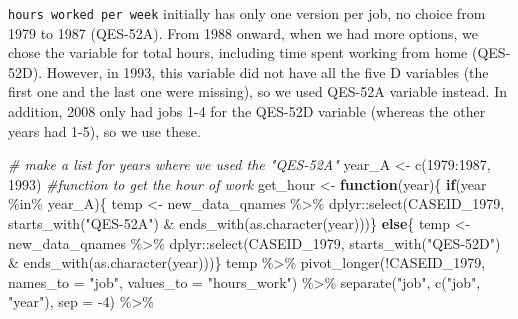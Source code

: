\documentclass[12pt]{article}
\newenvironment{Shaded}{\begin{snugshade}}{\end{snugshade}}
\newcommand{\AttributeTok}[1]{\textcolor[rgb]{0.77,0.63,0.00}{#1}}
\newcommand{\CommentTok}[1]{\textcolor[rgb]{0.56,0.35,0.01}{\textit{#1}}}
\newcommand{\ControlFlowTok}[1]{\textcolor[rgb]{0.13,0.29,0.53}{\textbf{#1}}}
\newcommand{\DecValTok}[1]{\textcolor[rgb]{0.00,0.00,0.81}{#1}}
\newcommand{\FunctionTok}[1]{\textcolor[rgb]{0.00,0.00,0.00}{#1}}
\newcommand{\NormalTok}[1]{#1}
\newcommand{\OtherTok}[1]{\textcolor[rgb]{0.56,0.35,0.01}{#1}}
\newcommand{\SpecialCharTok}[1]{\textcolor[rgb]{0.00,0.00,0.00}{#1}}
\newcommand{\StringTok}[1]{\textcolor[rgb]{0.31,0.60,0.02}{#1}}
\begin{document}
\texttt{hours\ worked\ per\ week} initially has only one version per job, no choice from 1979 to 1987 (QES-52A). From 1988 onward, when we had more options, we chose the variable for total hours, including time spent working from home (QES-52D). However, in 1993, this variable did not have all the five D variables (the first one and the last one were missing), so we used QES-52A variable instead. In addition, 2008 only had jobs 1-4 for the QES-52D variable (whereas the other years had 1-5), so we use these.

\begin{Shaded}
\begin{Highlighting}[]
\CommentTok{\# make a list for years where we used the "QES{-}52A"}
\NormalTok{year\_A }\OtherTok{\textless{}{-}} \FunctionTok{c}\NormalTok{(}\DecValTok{1979}\SpecialCharTok{:}\DecValTok{1987}\NormalTok{, }\DecValTok{1993}\NormalTok{)}
\CommentTok{\#function to get the hour of work}
\NormalTok{get\_hour }\OtherTok{\textless{}{-}} \ControlFlowTok{function}\NormalTok{(year)\{}
  \ControlFlowTok{if}\NormalTok{(year }\SpecialCharTok{\%in\%}\NormalTok{ year\_A)\{}
\NormalTok{    temp }\OtherTok{\textless{}{-}}\NormalTok{ new\_data\_qnames }\SpecialCharTok{\%\textgreater{}\%}
\NormalTok{      dplyr}\SpecialCharTok{::}\FunctionTok{select}\NormalTok{(CASEID\_1979,}
                    \FunctionTok{starts\_with}\NormalTok{(}\StringTok{"QES{-}52A"}\NormalTok{) }\SpecialCharTok{\&}
                      \FunctionTok{ends\_with}\NormalTok{(}\FunctionTok{as.character}\NormalTok{(year)))\}}
  \ControlFlowTok{else}\NormalTok{\{}
\NormalTok{    temp }\OtherTok{\textless{}{-}}\NormalTok{ new\_data\_qnames }\SpecialCharTok{\%\textgreater{}\%}
\NormalTok{      dplyr}\SpecialCharTok{::}\FunctionTok{select}\NormalTok{(CASEID\_1979,}
                    \FunctionTok{starts\_with}\NormalTok{(}\StringTok{"QES{-}52D"}\NormalTok{) }\SpecialCharTok{\&}
                      \FunctionTok{ends\_with}\NormalTok{(}\FunctionTok{as.character}\NormalTok{(year)))\}}
\NormalTok{  temp }\SpecialCharTok{\%\textgreater{}\%}
    \FunctionTok{pivot\_longer}\NormalTok{(}\SpecialCharTok{!}\NormalTok{CASEID\_1979,}
                 \AttributeTok{names\_to =} \StringTok{"job"}\NormalTok{,}
                 \AttributeTok{values\_to =} \StringTok{"hours\_work"}\NormalTok{) }\SpecialCharTok{\%\textgreater{}\%}
    \FunctionTok{separate}\NormalTok{(}\StringTok{"job"}\NormalTok{, }\FunctionTok{c}\NormalTok{(}\StringTok{"job"}\NormalTok{, }\StringTok{"year"}\NormalTok{), }\AttributeTok{sep =} \SpecialCharTok{{-}}\DecValTok{4}\NormalTok{) }\SpecialCharTok{\%\textgreater{}\%}

\end{Highlighting}
\end{Shaded}
\end{document}
